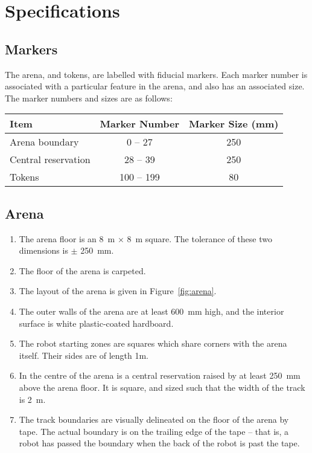 \section{Specifications}
\label{sec:specs}

\subsection{Markers}
\label{spec:markers}

The arena, and tokens, are labelled with fiducial markers. Each
marker number is associated with a particular feature in the arena,
and also has an associated size.  The marker numbers and sizes are
as follows:

\begin{center}
\begin{tabular}{lcc}
  \toprule
  \textbf{Item} & \textbf{Marker Number} & \textbf{Marker Size (\si{mm})} \\
  \midrule
  Arena boundary & 0 -- 27 & 250 \\
  Central reservation & 28 -- 39 & 250  \\
  Tokens & 100 -- 199 & 80 \\
  \bottomrule
\end{tabular}
\end{center}

\subsection{Arena}
\label{spec:arena}

\begin{enumerate}
  \item The arena floor is an \SI{8}{m} $\times$ \SI{8}{m} square. The tolerance
        of these two dimensions is $\pm$ \SI{250}{mm}.
  \item The floor of the arena is carpeted.
  \item The layout of the arena is given in Figure~\ref{fig:arena}.
  \item The outer walls of the arena are at least \SI{600}{mm} high, and the
        interior surface is white plastic-coated hardboard.
  \item The robot starting zones are squares which share corners with the arena
        itself. Their sides are of length \si{1}{m}.
  \item In the centre of the arena is a central reservation raised by
        at least \SI{250}{mm} above the arena floor. It is square, and
        sized such that the width of the track is \SI{2}{m}.
  \item The track boundaries are visually delineated on the floor of the arena
        by tape. The actual boundary is on the trailing edge of the tape --
        that is, a robot has passed the boundary when the back of the robot
        is past the tape.
\end{enumerate}

